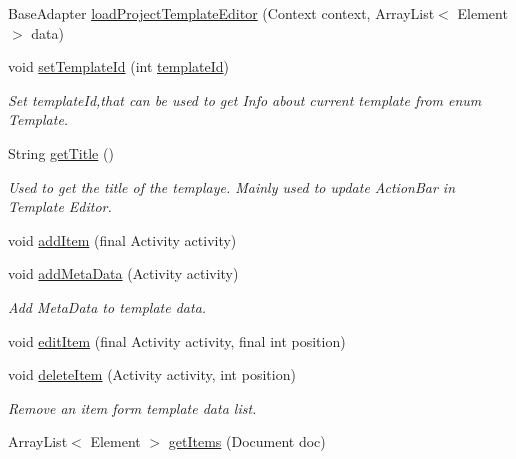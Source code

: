 \begin{DoxyCompactItemize}
\item 
Base\+Adapter \hyperlink{classorg_1_1buildmlearn_1_1toolkit_1_1templates_1_1QuizTemplate_a546b1ec5e027883034daa14ef725c4ff}{load\+Project\+Template\+Editor} (Context context, Array\+List$<$ Element $>$ data)
\item 
void \hyperlink{classorg_1_1buildmlearn_1_1toolkit_1_1templates_1_1QuizTemplate_a588fb1cbd0659ac8ebda7b7835b7ba9c}{set\+Template\+Id} (int \hyperlink{classorg_1_1buildmlearn_1_1toolkit_1_1templates_1_1QuizTemplate_a3aa259fc687f8ba50518707c422a9611}{template\+Id})
\begin{DoxyCompactList}\small\item\em Set template\+Id,that can be used to get Info about current template from enum Template. \end{DoxyCompactList}\item 
String \hyperlink{classorg_1_1buildmlearn_1_1toolkit_1_1templates_1_1QuizTemplate_a69f511c03a64a4945ffb41339666fcaa}{get\+Title} ()
\begin{DoxyCompactList}\small\item\em Used to get the title of the templaye. Mainly used to update Action\+Bar in Template Editor. \end{DoxyCompactList}\item 
void \hyperlink{classorg_1_1buildmlearn_1_1toolkit_1_1templates_1_1QuizTemplate_af16912a1df8554f8131d706f5ed491d9}{add\+Item} (final Activity activity)
\item 
void \hyperlink{classorg_1_1buildmlearn_1_1toolkit_1_1templates_1_1QuizTemplate_adb59144defde290d4856dbc46160d39a}{add\+Meta\+Data} (Activity activity)
\begin{DoxyCompactList}\small\item\em Add Meta\+Data to template data. \end{DoxyCompactList}\item 
void \hyperlink{classorg_1_1buildmlearn_1_1toolkit_1_1templates_1_1QuizTemplate_a061e888a27db66b5b9d408a1067d4eac}{edit\+Item} (final Activity activity, final int position)
\item 
void \hyperlink{classorg_1_1buildmlearn_1_1toolkit_1_1templates_1_1QuizTemplate_aeefd643c10acdd3721513fccd5166306}{delete\+Item} (Activity activity, int position)
\begin{DoxyCompactList}\small\item\em Remove an item form template data list. \end{DoxyCompactList}\item 
Array\+List$<$ Element $>$ \hyperlink{classorg_1_1buildmlearn_1_1toolkit_1_1templates_1_1QuizTemplate_a3d41a179fe1b10edd828d4ef4f0fb344}{get\+Items} (Document doc)

\end{DoxyCompactItemize}
